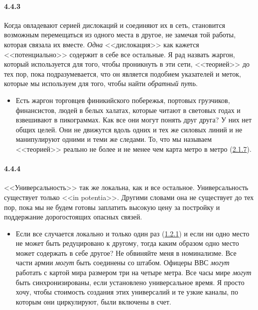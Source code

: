 \paragraph{4.4.3}\hypertarget{par:4.4.3}{} Когда овладевают серией дислокаций и соединяют их в сеть, становится возможным перемещаться из одного места в другое, не замечая той работы, которая связала их вместе. {\itshape Одна} <<дислокация>> как кажется <<потенциально>> содержит в себе все остальные. Я рад назвать жаргон, который используется для того, чтобы проникнуть в эти сети, <<теорией>> до тех пор, пока подразумевается, что он является подобием указателей и меток, которые мы используем для того, чтобы найти {\itshape обратный путь}.
	\begin{itemize}
	\item 
	Есть жаргон торговцев финикийского побережья, портовых грузчиков, финансистов, людей в белых халатах, которые читают в световых годах и взвешивают в пикограммах. Как все они могут понять друг друга? У них нет общих целей. Они не движутся вдоль одних и тех же силовых линий и не манипулируют одними и теми же следами. То, что мы называем <<теорией>> реально не более и не менее чем карта метро в метро (\hyperlink{par:2.1.7}{2.1.7}).
	\end{itemize}	


\paragraph{4.4.4}\hypertarget{par:4.4.4}{} <<Универсальность>> так же локальна, как и все остальное. Универсальность существует только <<in potentia>>. Другими словами она не существует до тех пор, пока мы не будем готовы заплатить высокую цену за постройку и поддержание дорогостоящих опасных связей. 
	\begin{itemize}
	\item 
	Если все случается локально и только один раз (\hyperlink{par:1.2.1}{1.2.1}) и если ни одно место не может быть редуцировано к другому, тогда каким образом одно место может содержать в себе другое? Не обвиняйте меня в номинализме. Все части армии {\itshape могут} быть соединены со штабом. Офицеры ВВС {\itshape могут} работать с картой мира размером три на четыре метра. Все часы мире {\itshape могут} быть синхронизированы, если установлено универсальное время. Я просто хочу, чтобы стоимость создания этих универсалий и те узкие каналы, по которым они циркулируют, были включены в счет.
	\end{itemize}	


